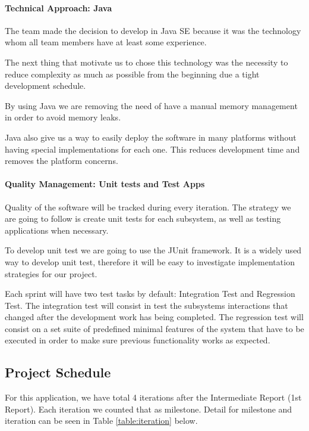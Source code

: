 \documentclass[11pt]{article}
\begin{document}
	\paragraph{Technical Approach: Java} The team made the decision to develop in Java SE because it was the technology whom all team members have at least some experience. 
	
	The next thing that motivate us to chose this technology was the necessity to reduce complexity as much as possible from the beginning due a tight development schedule. 
	
	By using Java we are removing the need of have a manual memory management in order to avoid memory leaks.
	
	Java also give us a way to easily deploy the software in many platforms without having special implementations for each one. This reduces development time and removes the platform concerns.
	
	\paragraph{Quality Management: Unit tests and Test Apps} Quality of the software will be tracked during every iteration. The strategy we are going to follow is create unit tests for each subsystem, as well as testing applications when necessary.  
	
	To develop unit test we are going to use the JUnit framework. It is a widely used way to develop unit test, therefore it will be easy to investigate implementation strategies for our project. 
	
	Each sprint will have two test tasks by default: Integration Test and Regression Test. The integration test will consist in test the subsystems interactions that changed after the development work has being completed. The regression test will consist on a set suite of predefined minimal features of the system that have to be executed in order to make sure previous functionality works as expected.
	
\subsection{Project Schedule}

 For this application, we have total 4 iterations after the Intermediate Report (1st Report). Each iteration we counted that as milestone. Detail for milestone and iteration can be seen in Table \ref{table:iteration} below.
\end{document}
